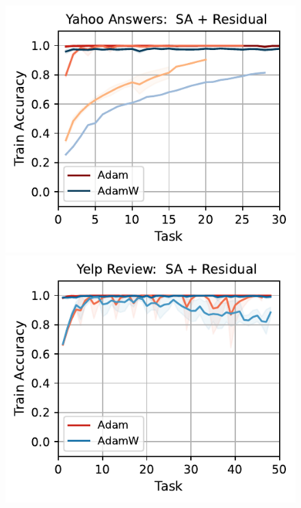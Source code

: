 \begin{figure}[t]
{    \includegraphics[width=\textwidth]{figs/Accuracy/nlp/attention_residual/yahoo_answers_40.pdf}
    \includegraphics[width=\textwidth]{figs/Accuracy/nlp/attention_residual/yelp_review_full_40.pdf}
    }
    \\
    \resizebox{\textwidth}{!}{      
}
\end{figure}

